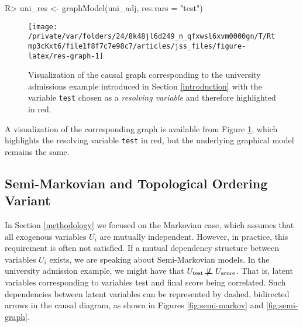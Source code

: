 \documentclass[
  nojss]{jss}
\begin{document}
\begin{CodeChunk}
\begin{CodeInput}
R> uni_res <- graphModel(uni_adj, res.vars = "test")
\end{CodeInput}
\end{CodeChunk}

\begin{CodeChunk}
\begin{figure}

{\centering \texttt{[image: /private/var/folders/24/8k48jl6d249\_n\_qfxwsl6xvm0000gn/T/Rtmp3cKxt6/file1f8f7c7e98c7/articles/jss\_files/figure-latex/res-graph-1]} 

}

\caption[Visualization of the causal graph corresponding to the university admissions example introduced in Section \ref{introduction} with the variable \texttt{test} chosen as a \textit{resolving variable} and therefore highlighted in red]{Visualization of the causal graph corresponding to the university admissions example introduced in Section \ref{introduction} with the variable \texttt{test} chosen as a \textit{resolving variable} and therefore highlighted in red.}\label{fig:res-graph}
\end{figure}
\end{CodeChunk}

A visualization of the corresponding graph is available from Figure
\ref{fig:res-graph}, which highlights the resolving variable
\texttt{test} in red, but the underlying graphical model remains the
same.

\hypertarget{semi-markovian-and-topological-ordering-variant}{%
\subsection{Semi-Markovian and Topological Ordering
Variant}\label{semi-markovian-and-topological-ordering-variant}}

In Section \ref{methodology} we focused on the Markovian case, which
assumes that all exogenous variables \(U_i\) are mutually independent.
However, in practice, this requirement is often not satisfied. If a
mutual dependency structure between variables \(U_i\) exists, we are
speaking about Semi-Markovian models. In the university admission
example, we might have that
\(U_{\text{test}} \not\!\perp\!\!\!\perp U_{\text{score}}\). That is,
latent variables corresponding to variables test and final score being
correlated. Such dependencies between latent variables can be
represented by dashed, bidirected arrows in the causal diagram, as shown
in Figures \ref{fig:semi-markov} and \ref{fig:semi-graph}.
\end{document}
